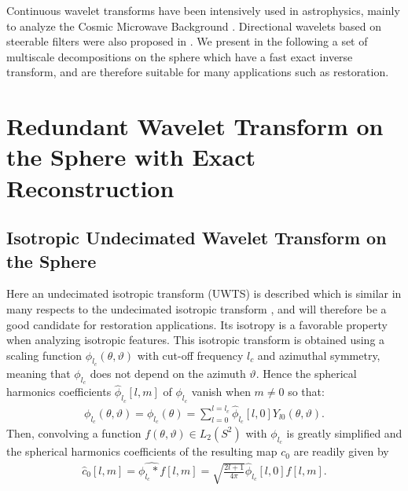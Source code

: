 Continuous wavelet transforms have been intensively used in astrophysics, mainly to analyze the Cosmic Microwave Background \citep{wave:vielva04}.
Directional wavelets based on steerable filters were also proposed in \citep{wiaux06,McEwen08}. We present in the following a set of multiscale 
decompositions on the sphere which have a fast exact inverse transform, and are therefore suitable for many applications such as restoration.
 




\section{Redundant Wavelet Transform on the Sphere with Exact Reconstruction}
\label{sect_wts}


\subsection{Isotropic Undecimated Wavelet Transform on the Sphere}
Here an undecimated isotropic transform (UWTS) is described which is similar in many respects to the undecimated isotropic transform 
\citep{starck2010,starck:sta06}, and will therefore be a good candidate for restoration applications. Its isotropy is a favorable 
property when analyzing isotropic features. This isotropic transform is obtained using a scaling function ${\phi}_{l_c}(\theta, \vartheta)$ 
with cut-off frequency  $l_c$ and  azimuthal symmetry, meaning that ${\phi}_{l_c}$ does not depend on the azimuth $\vartheta$. 
Hence the spherical harmonics coefficients $\hat {\phi}_{l_c} [l,m]$ of ${\phi}_{l_c}$ vanish when $m \ne 0$ so that:
\begin{eqnarray}
{\phi}_{l_c}(\theta, \vartheta)= {\phi}_{l_c}(\theta) = \sum_{l = 0}^{l = l_c} \hat  {\phi}_{l_c} [l,0] Y_{l0}(\theta, \vartheta) .
\end{eqnarray}
Then, convolving a function $f(\theta, \vartheta) \in L_2(S^2)$ with ${\phi}_{l_c}$ is greatly simplified 
and the spherical harmonics coefficients of the resulting map $c_0$ are readily given by
\begin{eqnarray}
 \hat c_{0}[l,m] = \widehat{{\phi}_{l_c} * f} [l,m] = \sqrt{\frac{2l+1}{4\pi} } \hat {\phi}_{l_c} [l,0] \hat f[l,m]  .
\end{eqnarray}

